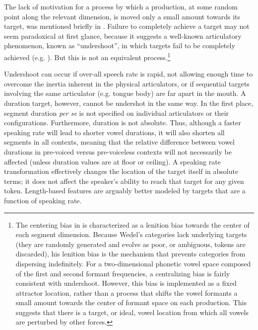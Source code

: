 The lack of motivation for a process by which a production, at some
random point along the relevant dimension, is moved only a small amount
towards its target, was mentioned briefly in .
Failure to completely achieve a target may not seem paradoxical at
first glance, because it suggests a well-known articulatory phenomenon,
known as “undershoot”, in which targets fail to be completely
achieved (e.g. \citealt{Lindblom1963}). But this is not an equivalent
process.\footnote{The centering bias in \citet{Wedel2008} is characterized as a lenition
bias towards the center of each segment dimension. Because Wedel's
categories lack underlying targets (they are randomly generated and
evolve as poor, or ambiguous, tokens are discarded), his lenition
bias is the mechanism that prevents categories from dispersing indefinitely.
For a two-dimensional phonetic vowel space composed of the first and
second formant frequencies, a centralizing bias is fairly consistent
with undershoot. However, this bias is implemented as a fixed attractor
location, rather than a process that shifts the vowel formants a small
amount towards the center of formant space on each production. This
suggests that there is a target, or ideal, vowel location from which
all vowels are perturbed by other forces. }

Undershoot can occur if over-all speech rate is rapid, not allowing
enough time to overcome the inertia inherent in the physical articulators,
or if sequential targets involving the same articulator (e.g. tongue
body) are far apart in the mouth. A duration target, however, cannot
be undershot in the same way. In the first place, segment duration
\emph{per se} is not specified on individual articulators or their
configurations. Furthermore, duration is not absolute. Thus, although
a faster speaking rate will lead to shorter vowel durations, it will
also shorten all segments in all contexts, meaning that the relative
difference between vowel durations in pre-voiced versus pre-voiceless
contexts will not necessarily be affected (unless duration values
are at floor or ceiling). A speaking rate transformation effectively
changes the location of the target itself in absolute terms; it does
not affect the speaker's ability to reach that target for any given
token. Length-based features are arguably better modeled by targets
that are a function of speaking rate. 

